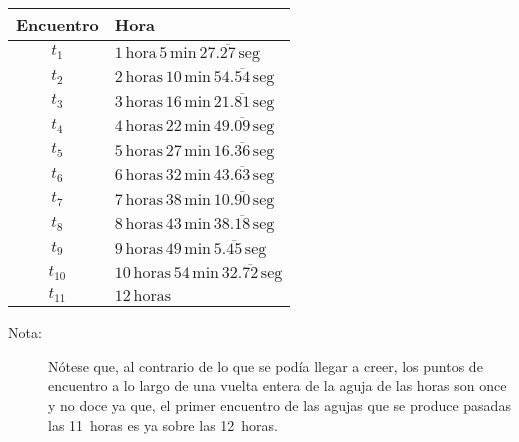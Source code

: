 \documentclass[a4paper,11pt]{article}
\begin{document}
\begin{description}
\begin{center}
\begin{tabular}{|c|l|}
\hline
Encuentro & Hora \\
\hline
$t_1$ & $1\,\text{hora}\,5\,\text{min}\,27.\overline{27}\,\text{seg}$ \\
$t_2$ & $2\,\text{horas}\,10\,\text{min}\,54.\overline{54}\,\text{seg}$ \\
$t_3$ & $3\,\text{horas}\,16\,\text{min}\,21.\overline{81}\,\text{seg}$ \\
$t_4$ & $4\,\text{horas}\,22\,\text{min}\,49.\overline{09}\,\text{seg}$ \\
$t_5$ & $5\,\text{horas}\,27\,\text{min}\,16.\overline{36}\,\text{seg}$ \\
$t_6$ & $6\,\text{horas}\,32\,\text{min}\,43.\overline{63}\,\text{seg}$ \\
$t_7$ & $7\,\text{horas}\,38\,\text{min}\,10.\overline{90}\,\text{seg}$ \\
$t_8$ & $8\,\text{horas}\,43\,\text{min}\,38.\overline{18}\,\text{seg}$ \\
$t_9$ & $9\,\text{horas}\,49\,\text{min}\,5.\overline{45}\,\text{seg}$ \\
$t_{10}$ & $10\,\text{horas}\,54\,\text{min}\,32.\overline{72}\,\text{seg}$ \\
$t_{11}$ & $12\,\text{horas}$ \\
\hline
\end{tabular}
\end{center}

\begin{description}
\item[Nota:]
N\'otese que, al contrario de lo que se pod\'ia llegar a creer, los puntos de
encuentro a lo largo de una vuelta entera de la aguja de las horas son once y
no doce ya que, el primer encuentro de las agujas que se produce pasadas las
\mbox{11 horas} es ya sobre las \mbox{12 horas}.
\end{description}

\end{description}
\end{document}
